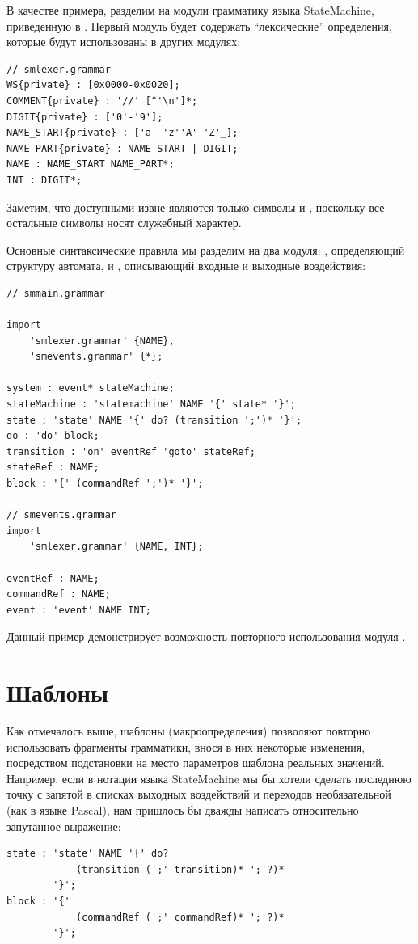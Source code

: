 В качестве примера, разделим на модули грамматику языка StateMachine, приведенную в . Первый модуль  будет содержать ``лексические'' определения, которые будут использованы в других модулях:
\begin{lstlisting}
// smlexer.grammar
WS{private} : [0x0000-0x0020];
COMMENT{private} : '//' [^'\n']*;
DIGIT{private} : ['0'-'9'];
NAME_START{private} : ['a'-'z''A'-'Z'_];
NAME_PART{private} : NAME_START | DIGIT;
NAME : NAME_START NAME_PART*;
INT : DIGIT*;
\end{lstlisting}
Заметим, что доступными извне являются только символы  и , поскольку все остальные символы носят служебный характер.

Основные синтаксические правила мы разделим на два модуля: , определяющий структуру автомата, и , описывающий входные и выходные воздействия:
\begin{lstlisting}
// smmain.grammar

import 
	'smlexer.grammar' {NAME},
	'smevents.grammar' {*};

system : event* stateMachine;
stateMachine : 'statemachine' NAME '{' state* '}';
state : 'state' NAME '{' do? (transition ';')* '}';
do : 'do' block;
transition : 'on' eventRef 'goto' stateRef;
stateRef : NAME;
block : '{' (commandRef ';')* '}';

// smevents.grammar
import 
	'smlexer.grammar' {NAME, INT};
	
eventRef : NAME;
commandRef : NAME;
event : 'event' NAME INT;
\end{lstlisting}
Данный пример демонстрирует возможность повторного использования модуля .

\chapter{Шаблоны}

Как отмечалось выше, шаблоны (макроопределения) позволяют повторно использовать фрагменты грамматики, внося в них некоторые изменения, посредством подстановки на место параметров шаблона реальных значений. Например, если в нотации языка StateMachine мы бы хотели сделать последнюю точку с запятой в списках выходных воздействий и переходов необязательной (как в языке Pascal), нам пришлось бы дважды написать относительно запутанное выражение:
\begin{lstlisting}
state : 'state' NAME '{' do? 
			(transition (';' transition)* ';'?)* 
		'}';
block : '{' 
			(commandRef (';' commandRef)* ';'?)* 
		'}';
\end{lstlisting}

